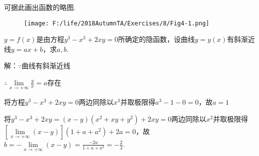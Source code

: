 \documentclass[12pt,UTF8]{ctexart}
\begin{document}
\begin{enumerate}
可据此画出函数的略图.
\begin{figure}[H]
\begin{center}
\texttt{[image: F:/life/2018AutumnTA/Exercises/8/Fig4-1.png]}
\end{center}
\end{figure}

$y=f(x)$是由方程$y^3-x^3+2xy=0$所确定的隐函数，设曲线$y=y(x)$有斜渐近线$y=ax+b$，求$a,b$.

解：$\because$曲线有斜渐近线

$\therefore\lim\limits_{x\rightarrow+\infty}\frac yx=a$存在

将方程$y^3-x^3+2xy=0$两边同除以$x^3$并取极限得$a^3-1-0=0$，故$a=1$

将$y^3-x^3+2xy=(x-y)(x^2+xy+y^2)+2xy=0$两边同除以$x^2$并取极限得$[\lim\limits_{x\rightarrow+\infty}(x-y)](1+a+a^2)+2a=0$，故$b=-\lim\limits_{x\rightarrow+\infty}(x-y)=\frac{-2a}{1+a+a^2}=-\frac23$.
\end{enumerate}
\end{document}
